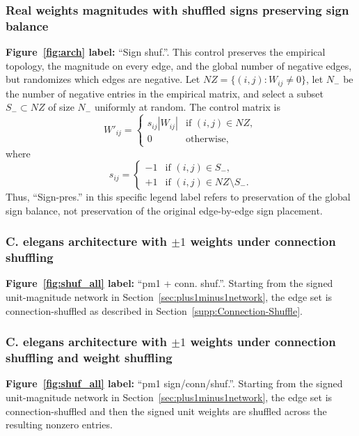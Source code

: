 \documentclass[a4paper,fleqn]{style_neural_networks/cas-dc}
\begin{document}
\subsubsection{Real weights magnitudes with shuffled signs preserving sign balance}
\label{supp:sign-pres_real_w}
\noindent\textbf{Figure~\ref{fig:arch} label:} \enquote{Sign shuf.}.
This control preserves the empirical topology, the magnitude on every edge, and the global number of negative edges, but randomizes which edges are negative. Let \(NZ=\{(i,j):W_{ij}\neq0\}\), let \(N_-\) be the number of negative entries in the empirical matrix, and select a subset \(S_-\subset NZ\) of size \(N_-\) uniformly at random. The control matrix is
\[
W'_{ij}=
\begin{cases}
s_{ij}|W_{ij}| & \text{if }(i,j)\in NZ,\\
0 & \text{otherwise},
\end{cases}
\]
where
\[
s_{ij}=
\begin{cases}
-1 & \text{if }(i,j)\in S_-,\\
+1 & \text{if }(i,j)\in NZ\setminus S_-.
\end{cases}
\]
Thus, ``Sign-pres.'' in this specific legend label refers to preservation of the global sign balance, not preservation of the original edge-by-edge sign placement.

\subsubsection[C. elegans architecture with signed unit weights under connection shuffling]{C. elegans architecture with $\pm 1$ weights under connection shuffling}
\noindent\textbf{Figure~\ref{fig:shuf_all} label:} \enquote{pm1 + conn. shuf.}.
Starting from the signed unit-magnitude network in Section~\ref{sec:plus1minus1network}, the edge set is connection-shuffled as described in Section~\ref{supp:Connection-Shuffle}.

\subsubsection[C. elegans architecture with signed unit weights under connection and weight shuffling]{C. elegans architecture with $\pm 1$ weights under connection shuffling and weight shuffling}
\noindent\textbf{Figure~\ref{fig:shuf_all} label:} \enquote{pm1 sign/conn/shuf.}.
Starting from the signed unit-magnitude network in Section~\ref{sec:plus1minus1network}, the edge set is connection-shuffled and then the signed unit weights are shuffled across the resulting nonzero entries.
\end{document}
